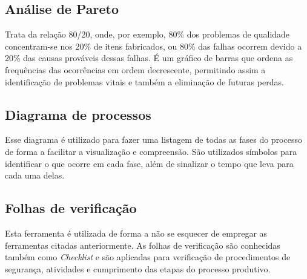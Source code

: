 \subsection{Análise de Pareto}
Trata da relação 80/20, onde, por exemplo, 80\% dos problemas de qualidade concentram-se nos 20\% de itens fabricados, ou 80\% das falhas ocorrem devido a 20\% das causas prováveis dessas falhas. É um gráfico de barras que ordena as frequências das ocorrências em ordem decrescente, permitindo assim a identificação de problemas vitais e também a eliminação de futuras perdas. 

\subsection{Diagrama de processos}
Esse diagrama é utilizado para fazer uma listagem de todas as fases do processo de forma a facilitar a visualização e compreensão. São utilizados símbolos para identificar o que ocorre em cada fase, além de sinalizar o tempo que leva para cada uma delas.

\subsection{Folhas de verificação}
Esta ferramenta é utilizada de forma a não se esquecer de empregar as ferramentas citadas anteriormente. As folhas de verificação são conhecidas também como \textit{Checklist} e são aplicadas para verificação de procedimentos de segurança, atividades e cumprimento das etapas do processo produtivo.

